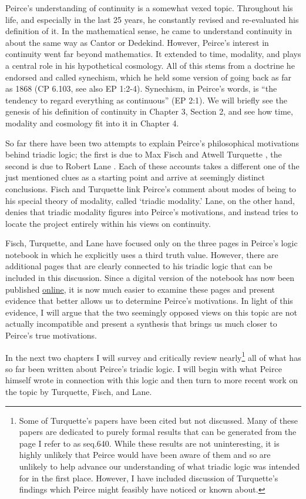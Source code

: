 Peirce's understanding of continuity is a somewhat vexed topic. Throughout his life, and especially in the last 25 years, he constantly revised and re-evaluated his definition of it. In the mathematical sense, he came to understand continuity in about the same way as Cantor or Dedekind. However, Peirce's interest in continuity went far beyond mathematics. It extended to time, modality, and plays a central role in his hypothetical cosmology. All of this stems from a doctrine he endorsed and called synechism, which he held some version of going back as far as 1868 (CP 6.103, see also EP 1:2-4). Synechism, in Peirce's words, is ``the tendency to regard everything as continuous'' (EP 2:1). We will briefly see the genesis of his definition of continuity in Chapter 3, Section 2, and see how time, modality and cosmology fit into it in Chapter 4.

So far there have been two attempts to explain Peirce's philosophical motivations behind triadic logic; the first is due to Max Fisch and Atwell Turquette \citeyearpar{fisch_peirces_1966}, the second is due to Robert Lane \citeyearpar{lane_peirces_1999}. Each of these accounts takes a different one of the just mentioned clues as a starting point and arrive at seemingly distinct conclusions. Fisch and Turquette link Peirce's comment about modes of being to his special theory of modality, called `triadic modality.' Lane, on the other hand, denies that triadic modality figures into Peirce's motivations, and instead tries to locate the project entirely within his views on continuity.

Fisch, Turquette, and Lane have focused only on the three pages in Peirce's logic notebook in which he explicitly uses a third truth value. However, there are additional pages that are clearly connected to his triadic logic that can be included in this discussion. Since a digital version of the notebook has now been published \href{https://iiif.lib.harvard.edu/manifests/view/drs:15255301$637i}{online}, it is now much easier to examine these pages and present evidence that better allows us to determine Peirce's motivations. In light of this evidence, I will argue that the two seemingly opposed views on this topic are not actually incompatible and present a synthesis that brings us much closer to Peirce's true motivations.


In the next two chapters I will survey and critically review nearly\footnote{Some of Turquette's papers have been cited but not discussed. Many of these papers are dedicated to purely formal results that can be generated from the page I refer to as seq.640. While these results are not uninteresting, it is highly unlikely that Peirce would have been aware of them and so are unlikely to help advance our understanding of what triadic logic was intended for in the first place. However, I have included discussion of Turquette's findings which Peirce might feasibly have noticed or known about.} all of  what has so far been written about Peirce's triadic logic. I will begin with what Peirce himself wrote in connection with this logic and then turn to more recent work on the topic by Turquette, Fisch, and Lane.

